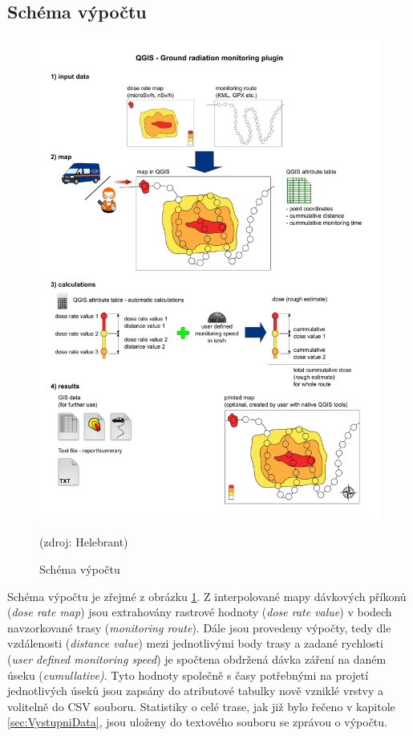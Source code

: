 \subsection{Schéma výpočtu}
\begin{figure}[H]
    \centering
    \includegraphics[scale=0.5]{./pictures/computation_scheme.png}
      	\caption[Schéma výpočtu]{Schéma výpočtu}(zdroj: Helebrant)
    	\label{fig:SchemeOfComputation}
\end{figure}

Schéma výpočtu je zřejmé z obrázku \ref{fig:SchemeOfComputation}. Z interpolované mapy dávkových příkonů (\textit{dose rate map}) jsou extrahovány rastrové hodnoty (\textit{dose rate value}) v bodech navzorkované trasy (\textit{monitoring route}). Dále jsou provedeny výpočty, tedy dle vzdálenosti (\textit{distance value}) mezi jednotlivými body trasy a zadané rychlosti (\textit{user defined monitoring speed}) je spočtena obdržená dávka záření na daném úseku (\textit{cumullative)}. Tyto hodnoty společně s časy potřebnými na projetí jednotlivých úseků jsou zapsány do atributové tabulky nově vzniklé vrstvy a volitelně do CSV souboru. Statistiky o celé trase, jak již bylo řečeno v kapitole \ref{sec:VystupniData}, jsou uloženy do textového souboru se zprávou o výpočtu.

